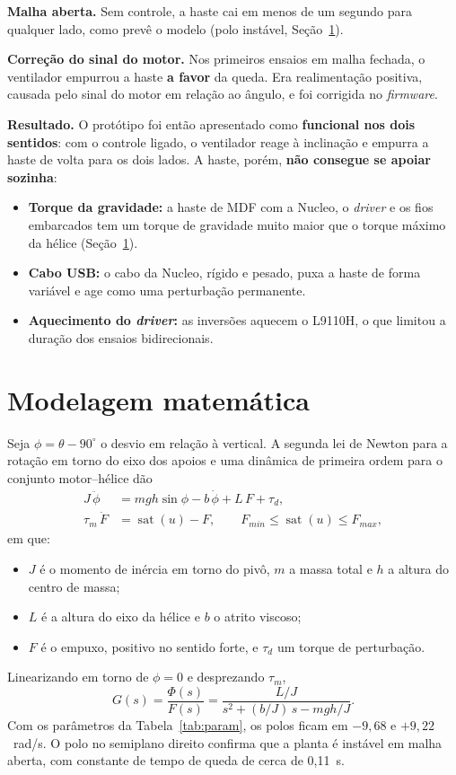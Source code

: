 \documentclass[a4paper,11pt]{article}
\begin{document}
\textbf{Malha aberta.} Sem controle, a haste cai em menos de um segundo para qualquer lado, como
prevê o modelo (polo instável, Seção~\ref{sec:modelo}).

\textbf{Correção do sinal do motor.} Nos primeiros ensaios em malha fechada, o ventilador empurrou a
haste \textbf{a favor} da queda. Era realimentação positiva, causada pelo sinal do motor em relação
ao ângulo, e foi corrigida no \textit{firmware}.

\textbf{Resultado.} O protótipo foi então apresentado como \textbf{funcional nos dois sentidos}: com o
controle ligado, o ventilador reage à inclinação e empurra a haste de volta para os dois lados. A
haste, porém, \textbf{não consegue se apoiar sozinha}:
\begin{itemize}
  \item \textbf{Torque da gravidade:} a haste de MDF com a Nucleo, o \textit{driver} e os fios
    embarcados tem um torque de gravidade muito maior que o torque máximo da hélice
    (Seção~\ref{sec:modelo}).
  \item \textbf{Cabo USB:} o cabo da Nucleo, rígido e pesado, puxa a haste de forma variável e age
    como uma perturbação permanente.
  \item \textbf{Aquecimento do \textit{driver}:} as inversões aquecem o L9110H, o que limitou a duração
    dos ensaios bidirecionais.
\end{itemize}

\section{Modelagem matemática}
\label{sec:modelo}

Seja $\phi=\theta-90^\circ$ o desvio em relação à vertical. A segunda lei de Newton para a rotação
em torno do eixo dos apoios e uma dinâmica de primeira ordem para o conjunto motor--hélice dão
\begin{align}
  J\,\ddot\phi &= m g h \sin\phi - b\,\dot\phi + L\,F + \tau_d, \label{eq:planta}\\
  \tau_m\,\dot F &= \operatorname{sat}(u) - F,\qquad F_{min} \le \operatorname{sat}(u) \le F_{max}, \label{eq:atuador}
\end{align}
em que:
\begin{itemize}
  \item $J$ é o momento de inércia em torno do pivô, $m$ a massa total e $h$ a altura do centro de
    massa;
  \item $L$ é a altura do eixo da hélice e $b$ o atrito viscoso;
  \item $F$ é o empuxo, positivo no sentido forte, e $\tau_d$ um torque de perturbação.
\end{itemize}
Linearizando em torno de $\phi=0$ e desprezando $\tau_m$,
\begin{equation}
  G(s)=\frac{\Phi(s)}{F(s)}=\frac{L/J}{s^2+(b/J)\,s-mgh/J}.
  \label{eq:G}
\end{equation}
Com os parâmetros da Tabela~\ref{tab:param}, os polos ficam em $-9{,}68$ e $+9{,}22$~rad/s. O polo
no semiplano direito confirma que a planta é instável em malha aberta, com constante de tempo de
queda de cerca de 0,11~s.
\end{document}
